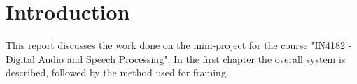\section{Introduction} \label{sec:introduction}
This report discusses the work done on the mini-project for the course "IN4182 - Digital Audio and Speech Processing". In the first chapter the overall system is described, followed by the method used for framing.
